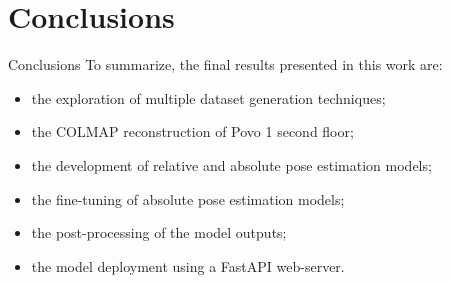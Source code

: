 \documentclass[
    center,
]{beamer}
\begin{document}
\section{Conclusions}
\begin{frame}{Conclusions}
    To summarize, the final results presented in this work are:
    \begin{itemize}
        \item the exploration of multiple dataset generation techniques;
        \item the COLMAP reconstruction of Povo 1 second floor;
        \item the development of relative and absolute pose estimation models;
        \item the fine-tuning of absolute pose estimation models;
        \item the post-processing of the model outputs;
        \item the model deployment using a FastAPI web-server.
    \end{itemize}
\end{frame}

\end{document}
